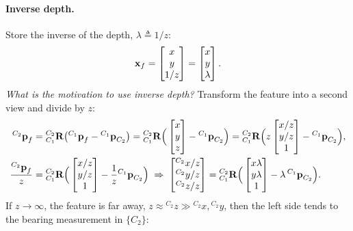 \paragraph{Inverse depth.} Store the inverse of the depth, $\lambda \triangleq 1/z$:
\begin{align}
\boldsymbol{\mathbf{x}}_f = \begin{bmatrix} x \\ y \\ 1/z \end{bmatrix} = \begin{bmatrix} x \\ y \\ \lambda \end{bmatrix}.
\end{align}
\emph{What is the motivation to use inverse depth?} Transform the feature into a second view and divide by $z$:
\begin{align}
{}^{C_2}\boldsymbol{\mathbf{p}}_f &= {}^{C_2}_{C_1}\boldsymbol{\mathbf{R}}\big({}^{C_1}\boldsymbol{\mathbf{p}}_f - {}^{C_1}\boldsymbol{\mathbf{p}}_{C_2}\big)
= {}^{C_2}_{C_1}\boldsymbol{\mathbf{R}}\Big(\begin{bmatrix} x \\ y \\ z \end{bmatrix} - {}^{C_1}\boldsymbol{\mathbf{p}}_{C_2}\Big)
= {}^{C_2}_{C_1}\boldsymbol{\mathbf{R}}\Big(z\begin{bmatrix} x/z \\ y/z \\ 1 \end{bmatrix} - {}^{C_1}\boldsymbol{\mathbf{p}}_{C_2}\Big), \\
\frac{{}^{C_2}\boldsymbol{\mathbf{p}}_f}{z} &= {}^{C_2}_{C_1}\boldsymbol{\mathbf{R}}\Big(\begin{bmatrix} x/z \\ y/z \\ 1 \end{bmatrix} - \frac{1}{z}{}^{C_1}\boldsymbol{\mathbf{p}}_{C_2}\Big)
\;\Rightarrow\;
\begin{bmatrix} {}^{C_2}x/z \\ {}^{C_2}y/z \\ {}^{C_2}z/z \end{bmatrix} = {}^{C_2}_{C_1}\boldsymbol{\mathbf{R}}\Big(\begin{bmatrix} x\lambda \\ y\lambda \\ 1 \end{bmatrix} - \lambda\,{}^{C_1}\boldsymbol{\mathbf{p}}_{C_2}\Big).
\end{align}
If $z\to\infty$, the feature is far away, $z\approx{}^{C_2}z \gg {}^{C_2}x,{}^{C_2}y$, then the left side tends to the bearing measurement in $\{C_2\}$:
